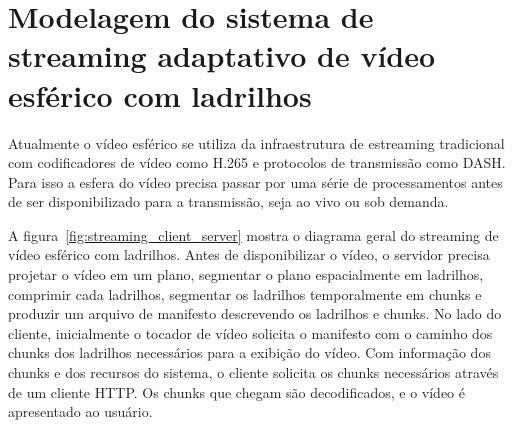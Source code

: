 


\chapter{Modelagem do sistema de streaming adaptativo de vídeo esférico com ladrilhos}\label{Cap:Problem Design}

Atualmente o vídeo esférico se utiliza da infraestrutura de estreaming tradicional com codificadores de vídeo como H.265 e protocolos de transmissão como DASH. Para isso a esfera do vídeo precisa passar por uma série de processamentos antes de ser disponibilizado para a transmissão, seja ao vivo ou sob demanda.

A figura~\ref{fig:streaming_client_server} mostra o diagrama geral do streaming de vídeo esférico com ladrilhos. Antes de disponibilizar o vídeo,  o servidor precisa projetar o vídeo em um plano, segmentar o plano espacialmente em ladrilhos, comprimir cada ladrilhos, segmentar os ladrilhos temporalmente em chunks e produzir um arquivo de manifesto descrevendo os ladrilhos e chunks. No lado do cliente, inicialmente o tocador de vídeo solicita o manifesto com o caminho dos chunks dos ladrilhos necessários para a exibição do vídeo. Com informação dos chunks e dos recursos do sistema, o cliente solicita os chunks necessários através de um cliente HTTP. Os chunks que chegam são decodificados, e o vídeo é apresentado ao usuário.

